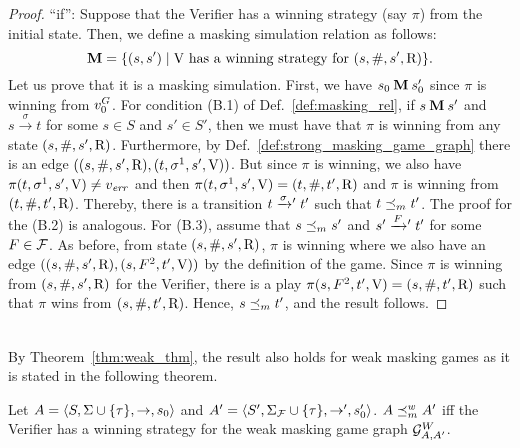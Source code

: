 \begin{proof}
``if'': Suppose that the Verifier has a winning strategy (say $\pi$) 
from the initial state. Then, we define a masking simulation relation 
as follows: 
\[
\mathbin{\mathbf{M}} = \{(s,s') \mid \mathrm{V} \text{ has a winning strategy for } (s, \#, s', \mathrm{R}) \}.
\]
Let us prove  that it is a masking simulation. 
First, we have $s_0 \mathbin{\mathbf{M}} s'_0$ since $\pi$ is winning from $v_0^G$. For condition (B.1) of Def.~\ref{def:masking_rel}, if
$s \mathbin{\mathbf{M}} s'$ and $s \xrightarrow{\sigma} t$ for some $s \in S$ and $s' \in S'$, then we must have that $\pi$ is winning from any 
state $(s,\#,s',\mathrm{R})$. Furthermore, by Def.~\ref{def:strong_masking_game_graph} there is an edge 
$((s,\#,s',\mathrm{R}), (t,\sigma^1,s',\mathrm{V}))$. 
But since $\pi$ is winning, we also have $\pi(t,\sigma^1,s',\mathrm{V}) \neq v_{\mathit{err}}$ and 
then $\pi(t,\sigma^1,s',\mathrm{V})=(t, \#, t', \mathrm{R})$ and $\pi$ is winning from  $(t, \#, t', \mathrm{R})$.
Thereby, there is a transition $t \mathrel{{\xrightarrow[]{\sigma}}{}'} t'$ such that
$t \preceq_{m} t'$. The proof for the (B.2) is analogous. For (B.3), assume that $s \preceq_{m} s'$ and $s' \mathrel{{\xrightarrow[]{F}}{}'} t'$ for some 
$F \in \mathcal{F}$. 
As before, from state  $(s,\#,s',\mathrm{R})$, $\pi$ is winning where we also have an edge $((s,\#,s',\mathrm{R}), (s,F^2,t',\mathrm{V}))$ by 
the definition of the game. 
Since $\pi$ is winning from $(s,\#,s',\mathrm{R})$ for the Verifier, there is a play $\pi(s,F^2,t',\mathrm{V}) = (s,\#,t',\mathrm{R})$ such that $\pi$ wins from 
$(s,\#,t',\mathrm{R})$. Hence, $s \preceq_{m} t'$, and the result follows.
\qedhere

\end{proof} \\

By Theorem~\ref{thm:weak_thm}, the result also holds for weak masking games as it is stated in the following theorem.

\begin{thm} \label{thm:weak_wingame_strat}
  Let $A=\langle S, \Sigma \cup \{\tau\}, \rightarrow, s_0 \rangle$ and
  $A'=\langle S', \Sigma_{\mathcal{F}} \cup \{\tau\}, \rightarrow', s'_0 \rangle$.
  $A \preceq^w_{m} A'$ iff the Verifier has a winning strategy for the
  weak masking game graph $\mathcal{G}^W_{A,A'}$.
\end{thm}


